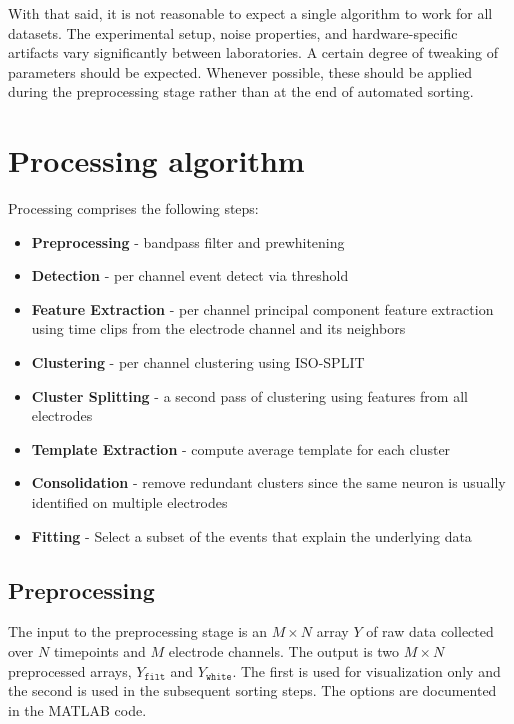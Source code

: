 \documentclass[hidelinks,10pt]{article}
\begin{document}
With that said, it is not reasonable to expect a single algorithm to work for all datasets. The experimental setup, noise properties, and hardware-specific artifacts vary significantly between laboratories. A certain degree of tweaking of parameters should be expected. Whenever possible, these should be applied during the preprocessing stage rather than at the end of automated sorting.

\section {Processing algorithm}
Processing comprises the following steps:

\begin{itemize}
\item \textbf{Preprocessing} - bandpass filter and prewhitening
\item \textbf{Detection} - per channel event detect via threshold
\item \textbf{Feature Extraction} - per channel principal component feature extraction using time clips from the electrode channel and its neighbors
\item \textbf{Clustering} - per channel clustering using ISO-SPLIT
\item \textbf{Cluster Splitting} - a second pass of clustering using features from all electrodes
\item \textbf{Template Extraction} - compute average template for each cluster
\item \textbf{Consolidation} - remove redundant clusters since the same neuron is usually identified on multiple electrodes
\item \textbf{Fitting} - Select a subset of the events that explain the underlying data
\end{itemize}

\subsection {Preprocessing}

The input to the preprocessing stage is an $M\times N$ array $Y$ of raw data collected over $N$ timepoints and $M$ electrode channels. The output is two $M\times N$ preprocessed arrays, $Y_\texttt{filt}$ and $Y_\texttt{white}$. The first is used for visualization only and the second is used in the subsequent sorting steps. The options are documented in the MATLAB code.
\end{document}

